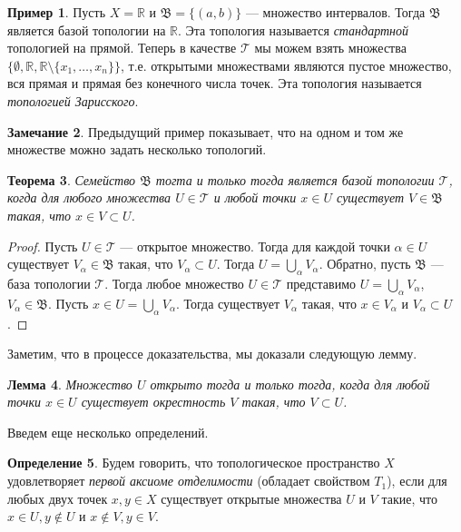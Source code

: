 \documentclass[12pt, titlepage, oneside]{amsbook}
\newcommand{\TTT}{{\mathcal T}}
\newcommand{\RR}{\mathbb{R}}
\newcommand{\BBB}{\mathfrak{B}}
\newtheorem{theorem}{Теорема}[chapter]
\newtheorem{lemma}[theorem]{Лемма}
\theoremstyle{definition}
\newtheorem{example}[theorem]{Пример}
\newtheorem{definition}[theorem]{Определение}
\newtheorem{remark}[theorem]{Замечание}
\theoremstyle{remark}
\begin{document}
\begin{example}
	Пусть $X=\RR$ и $\BBB=\{(a,b)\}$ --- множество интервалов. Тогда $\BBB$ является базой топологии на $\RR$. Эта топология называется \emph{стандартной} топологией на прямой. Теперь в качестве $\TTT$ мы можем взять множества $\{\emptyset,\RR,\RR\setminus\{x_1,\ldots,x_n\}\}$, т.е. открытыми множествами являются пустое множество, вся прямая и прямая без конечного числа точек. Эта топология называется \emph{топологией Зарисского}.
\end{example}

\begin{remark}
	Предыдущий пример показывает, что на одном и том же множестве можно задать несколько топологий.
\end{remark}

\begin{theorem}
	\label{Top1}
	Семейство $\BBB$ тогта и только тогда является базой топологии $\TTT$, когда для любого множества $U\in\TTT$ и любой точки $x\in U$ существует $V\in\BBB$ такая, что $x\in V\subset U$.
\end{theorem}

\begin{proof}
	Пусть $U\in\TTT$ --- открытое множество. Тогда для каждой точки $\alpha\in U$ существует $V_\alpha\in\BBB$ такая, что $V_\alpha\subset U$. Тогда $U=\bigcup\limits_{\alpha} V_\alpha$. Обратно, пусть $\BBB$ --- база топологии $\TTT$. Тогда любое множество $U\in\TTT$ представимо $U=\bigcup\limits_{\alpha} V_\alpha$, $V_\alpha\in\BBB$. Пусть $x\in U=\bigcup\limits_{\alpha} V_\alpha$. Тогда существует $V_\alpha$ такая, что $x\in V_\alpha$ и $V_\alpha\subset U$.
\end{proof}

Заметим, что в процессе доказательства, мы доказали следующую лемму.
\begin{lemma}
	\label{Top2}
	Множество $U$ открыто тогда и только тогда, когда для любой точки $x\in U$ существует окрестность $V$ такая, что $V\subset U$.
\end{lemma}

Введем еще несколько определений.

\begin{definition}
	Будем говорить, что топологическое пространство $X$ удовлетворяет \emph{первой аксиоме отделимости} (обладает свойством $T_1$), если для любых двух точек $x,y\in X$ существует открытые множества $U$ и $V$ такие, что $x\in U, y\not\in U$ и $x\not\in V, y\in V$.
\end{definition}
\end{document}
